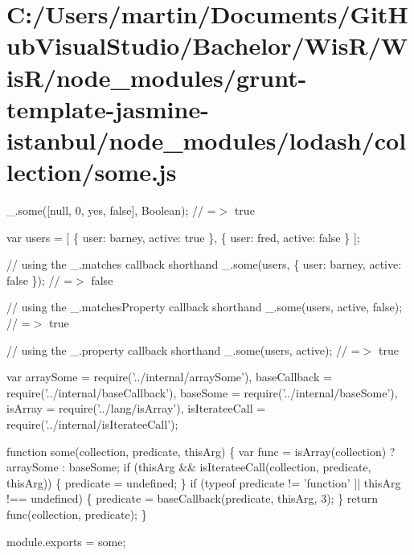 \hypertarget{_c_1_2_users_2martin_2_documents_2_git_hub_visual_studio_2_bachelor_2_wis_r_2_wis_r_2node_moduled56f6ad3fde7ce11d6547923518f4182}{}\section{C\+:/\+Users/martin/\+Documents/\+Git\+Hub\+Visual\+Studio/\+Bachelor/\+Wis\+R/\+Wis\+R/node\+\_\+modules/grunt-\/template-\/jasmine-\/istanbul/node\+\_\+modules/lodash/collection/some.\+js}
\+\_\+.\+some(\mbox{[}null, 0, \textquotesingle{}yes\textquotesingle{}, false\mbox{]}, Boolean); // =$>$ true

var users = \mbox{[} \{ \textquotesingle{}user\textquotesingle{}\+: \textquotesingle{}barney\textquotesingle{}, \textquotesingle{}active\textquotesingle{}\+: true \}, \{ \textquotesingle{}user\textquotesingle{}\+: \textquotesingle{}fred\textquotesingle{}, \textquotesingle{}active\textquotesingle{}\+: false \} \mbox{]};

// using the {\ttfamily \+\_\+.\+matches} callback shorthand \+\_\+.\+some(users, \{ \textquotesingle{}user\textquotesingle{}\+: \textquotesingle{}barney\textquotesingle{}, \textquotesingle{}active\textquotesingle{}\+: false \}); // =$>$ false

// using the {\ttfamily \+\_\+.\+matches\+Property} callback shorthand \+\_\+.\+some(users, \textquotesingle{}active\textquotesingle{}, false); // =$>$ true

// using the {\ttfamily \+\_\+.\+property} callback shorthand \+\_\+.\+some(users, \textquotesingle{}active\textquotesingle{}); // =$>$ true


\begin{DoxyCodeInclude}
var arraySome = require(\textcolor{stringliteral}{'../internal/arraySome'}),
    baseCallback = require(\textcolor{stringliteral}{'../internal/baseCallback'}),
    baseSome = require(\textcolor{stringliteral}{'../internal/baseSome'}),
    isArray = require(\textcolor{stringliteral}{'../lang/isArray'}),
    isIterateeCall = require(\textcolor{stringliteral}{'../internal/isIterateeCall'});

\textcolor{keyword}{function} some(collection, predicate, thisArg) \{
  var func = isArray(collection) ? arraySome : baseSome;
  \textcolor{keywordflow}{if} (thisArg && isIterateeCall(collection, predicate, thisArg)) \{
    predicate = undefined;
  \}
  \textcolor{keywordflow}{if} (typeof predicate != \textcolor{stringliteral}{'function'} || thisArg !== undefined) \{
    predicate = baseCallback(predicate, thisArg, 3);
  \}
  \textcolor{keywordflow}{return} func(collection, predicate);
\}

module.exports = some;
\end{DoxyCodeInclude}
 